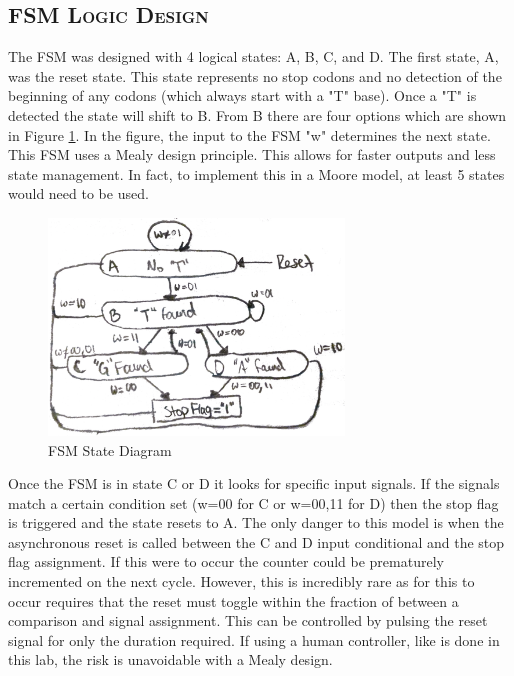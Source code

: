 \documentclass[11pt]{report}
\begin{document}
\begin{spacing}{1.5}
\subsection{\scshape FSM Logic Design}
\label{sub:design_counter}

The FSM was designed with 4 logical states: A, B, C, and D.  The first state, A, was the reset state.  This state represents no stop codons and no detection of the beginning of any codons (which always start with a "T" base).  Once a "T" is detected the state will shift to B.  From B there are four options which are shown in Figure \ref{fig:diag_fsm}.  In the figure, the input to the FSM "w" determines the next state.  This FSM uses a Mealy design principle.  This allows for faster outputs and less state management.  In fact, to implement this in a Moore model, at least 5 states would need to be used.

\vspace{15px}
\begin{figure}[H]
    \centering
    \includegraphics[width=0.7\textwidth,keepaspectratio]{fsm.png}
    \caption{FSM State Diagram}
    \label{fig:diag_fsm}
\end{figure}

Once the FSM is in state C or D it looks for specific input signals.  If the signals match a certain condition set (w=00 for C or w=00,11 for D) then the stop flag is triggered and the state resets to A.  The only danger to this model is when the asynchronous reset is called between the C and D input conditional and the stop flag assignment.  If this were to occur the counter could be prematurely incremented on the next cycle.  However, this is incredibly rare as for this to occur requires that the reset must toggle within the fraction of between a comparison and signal assignment.  This can be controlled by pulsing the reset signal for only the duration required.  If using a human controller, like is done in this lab, the risk is unavoidable with a Mealy design.


\end{spacing}
\end{document}
